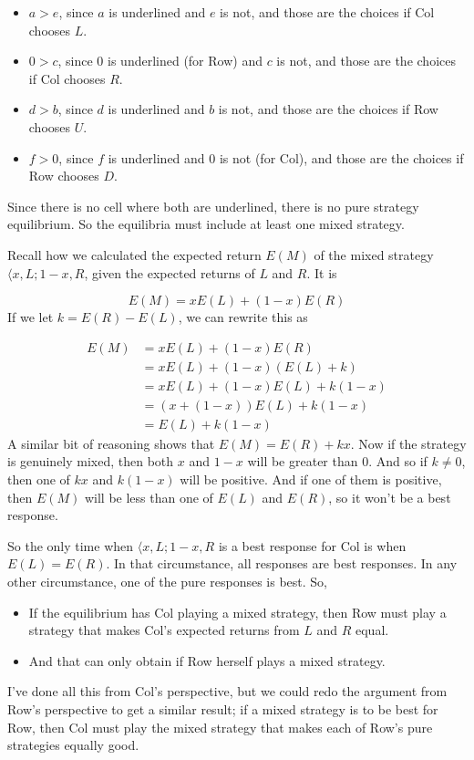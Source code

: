 \documentclass[openany]{book}
\begin{document}
\begin{itemize}
\item $a > e$, since $a$ is underlined and $e$ is not, and those are the choices if Col chooses $L$.
\item $0 > c$, since $0$ is underlined (for Row) and $c$ is not, and those are the choices if Col chooses $R$.
\item $d > b$, since $d$ is underlined and $b$ is not, and those are the choices if Row chooses $U$.
\item $f > 0$, since $f$ is underlined and $0$ is not (for Col), and those are the choices if Row chooses $D$.
\end{itemize}
Since there is no cell where both are underlined, there is no pure strategy equilibrium. So the equilibria must include at least one mixed strategy.

Recall how we calculated the expected return $E(M)$ of the mixed strategy $\langle x, L; 1-x, R$, given the expected returns of $L$ and $R$. It is

\begin{equation*}
E(M) = xE(L) + (1-x)E(R)
\end{equation*}
If we let $k = E(R) - E(L)$, we can rewrite this as

\begin{align*}
E(M) &= xE(L) + (1-x)E(R) \\
&= xE(L) + (1-x)(E(L) + k) \\
&= xE(L) + (1-x)E(L) + k(1-x) \\
&= (x + (1-x))E(L) + k(1-x) \\
&= E(L) + k(1-x)
\end{align*}
A similar bit of reasoning shows that $E(M) = E(R) + kx$. Now if the strategy is genuinely mixed, then both $x$ and $1-x$ will be greater than 0. And so if $k \neq 0$, then one of $kx$ and $k(1-x)$ will be positive. And if one of them is positive, then $E(M)$ will be less than one of $E(L)$ and $E(R)$, so it won't be a best response.

So the only time when $\langle x, L; 1-x, R$ is a best response for Col is when $E(L) = E(R)$. In that circumstance, all responses are best responses. In any other circumstance, one of the pure responses is best. So,

\begin{itemize}
\item If the equilibrium has Col playing a mixed strategy, then Row must play a strategy that makes Col's expected returns from $L$ and $R$ equal.
\item And that can only obtain if Row herself plays a mixed strategy.
\end{itemize}
I've done all this from Col's perspective, but we could redo the argument from Row's perspective to get a similar result; if a mixed strategy is to be best for Row, then Col must play the mixed strategy that makes each of Row's pure strategies equally good.
\end{document}
